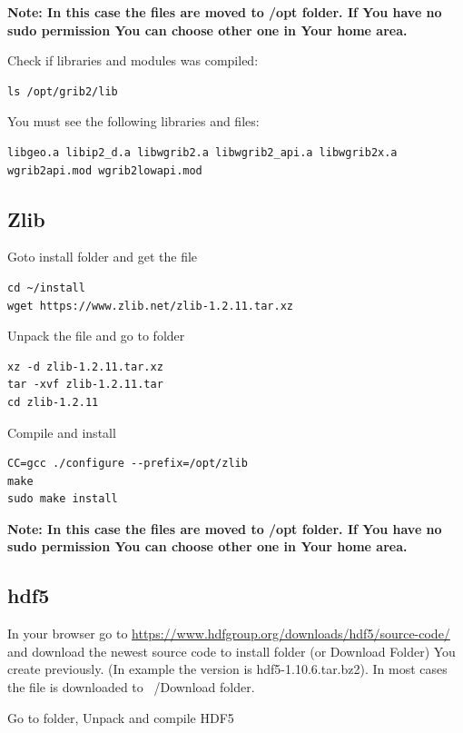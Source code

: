 \documentclass{article}
\begin{document}
\textbf{Note: In this case the files are moved to /opt folder. If You have no sudo permission You can choose other one in Your home area.}

Check if libraries and modules was compiled:

\begin{verbatim}
ls /opt/grib2/lib
\end{verbatim}

You must see the following libraries and files: 
\begin{verbatim}
libgeo.a libip2_d.a libwgrib2.a libwgrib2_api.a libwgrib2x.a wgrib2api.mod wgrib2lowapi.mod
\end{verbatim}

\subsection{Zlib}

Goto install folder and get the file

\begin{verbatim}
cd ~/install
wget https://www.zlib.net/zlib-1.2.11.tar.xz
\end{verbatim}

Unpack the file and go to folder

\begin{verbatim}
xz -d zlib-1.2.11.tar.xz
tar -xvf zlib-1.2.11.tar
cd zlib-1.2.11
\end{verbatim}

Compile and install

\begin{verbatim}
CC=gcc ./configure --prefix=/opt/zlib
make
sudo make install
\end{verbatim}

\textbf{Note: In this case the files are moved to /opt folder. If You have no sudo permission You can choose other one in Your home area.}

\subsection{hdf5}

In your browser go to \href{https://www.hdfgroup.org/downloads/hdf5/source-code/}{https://www.hdfgroup.org/downloads/hdf5/source-code/} and download the newest source code to install folder (or Download Folder) You create previously. (In example the version is hdf5-1.10.6.tar.bz2). In most cases the file is downloaded to ~/Download folder.

Go to folder, Unpack and compile HDF5
\end{document}

